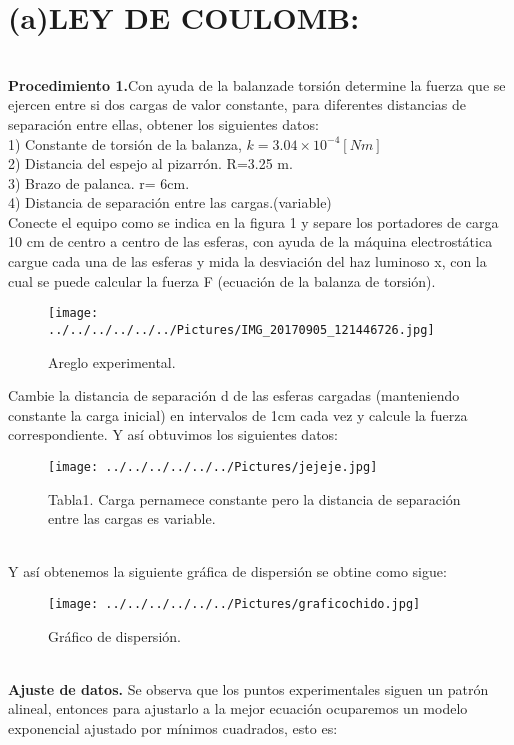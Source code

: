\documentclass[11pt,a4paper]{article}
\begin{document}
\section*{(a)LEY DE COULOMB:}\\
\textbf{Procedimiento 1.}Con ayuda de la balanzade torsi\'{o}n determine la fuerza que se ejercen entre si dos cargas de valor constante, para diferentes distancias de separaci\'{o}n entre ellas, obtener los siguientes datos:\\
1) Constante de torsi\'{o}n de la balanza, $k=3.04\times { 10 }^{ -4 }\left[ Nm \right] $\\
2) Distancia del espejo al pizarr\'{o}n. R=3.25 m.\\
3) Brazo de palanca. r= 6cm.\\
4) Distancia de separaci\'{o}n entre las cargas.(variable)\\
Conecte el equipo como se indica en la figura 1 y separe los portadores de carga 10 cm de centro a centro de las esferas, con ayuda de la m\'{a}quina electrost\'{a}tica cargue cada una de las esferas y mida la desviaci\'{o}n del haz luminoso x, con la cual se puede calcular la fuerza F (ecuaci\'{o}n de la balanza de torsi\'{o}n).
\begin{figure}[hbtp]
\centering
\texttt{[image: ../../../../../../Pictures/IMG\_20170905\_121446726.jpg]}
\caption{Areglo experimental.}
\end{figure}
Cambie la distancia de separaci\'{o}n d de las esferas cargadas (manteniendo constante la carga inicial) en intervalos de 1cm cada vez y calcule la fuerza correspondiente. Y as\'{i} obtuvimos los siguientes datos:
\begin{figure}[hbtp]
\centering
\texttt{[image: ../../../../../../Pictures/jejeje.jpg]} 
\caption{Tabla1. Carga pernamece constante pero la distancia de separaci\'{o}n entre las cargas es variable.}
\end{figure}
\\
Y as\'{i} obtenemos la siguiente gr\'{a}fica de dispersi\'{o}n se obtine como sigue:
\begin{figure}[hbtp]
\centering
\texttt{[image: ../../../../../../Pictures/graficochido.jpg]}
\caption{Gr\'{a}fico de dispersi\'{o}n.}
\end{figure}
\\
\textbf{Ajuste de datos.} Se observa que los puntos experimentales siguen un patr\'{o}n alineal, entonces para ajustarlo a la mejor ecuaci\'{o}n ocuparemos un modelo exponencial ajustado por m\'{i}nimos cuadrados, esto es:
\end{document}
